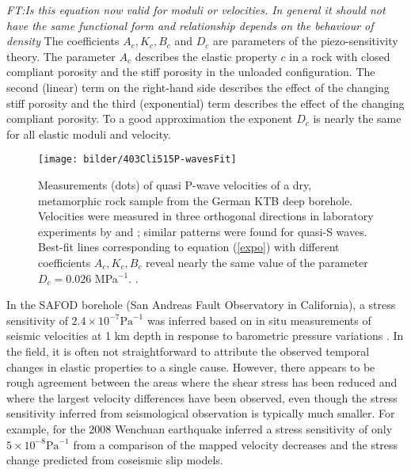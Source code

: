 \documentclass[11pt]{article}
\newcommand{\noteft}[1]{{\it \color{magenta} FT:#1}}
\newcommand{\noteft}[1]{}
\begin{document}
\begin{description}
\begin{equation}
\label{expo}
\end{equation}
\noteft{Is this equation now valid for moduli or velocities. In general it should not have the same functional form and relationship depends on the behaviour of density}
The  coefficients $A_c, K_c, B_c$ and
$D_c$ %
are parameters of the piezo-sensitivity
theory. The parameter $A_c$ describes the elastic property $c$ in a rock 
with closed compliant porosity and the stiff porosity in the unloaded 
configuration. The second (linear) term on the right-hand side describes 
the effect of the changing stiff porosity and the third (exponential) 
term describes the effect of the changing compliant porosity. To a good 
approximation the exponent $D_c$ is nearly the same for all elastic 
moduli and velocity.

\begin{SCfigure}%
         \centering
 \texttt{[image: bilder/403Cli515P-wavesFit]}
            \caption{\footnotesize Measurements (dots) of quasi P-wave velocities %
    of a dry, metamorphic rock sample from the German KTB deep borehole.
    Velocities were measured in three
    orthogonal directions 
    in laboratory experiments by \citet{Kern90} and \citet{Kern91}; similar patterns were found for quasi-S waves.
    Best-fit lines corresponding to equation (\ref{expo})
    with different coefficients $A_c, K_c, B_c$
    reveal nearly the same
      value of the parameter $D_c = 0.026$ MPa$^{-1}$. \citep[After][]{shapiroKaselow2005}.}
                   \label{fig_ktb_velocities}
	        \end{SCfigure}
	        
In the SAFOD borehole (San Andreas Fault Observatory in California), a stress sensitivity of $2.4\!\times\!10^{-7} \mbox{Pa}^{-1}$ was inferred based on in situ measurements of seismic velocities at 1 km depth in response to barometric pressure variations \citep{niu08}. In the field, it is often not straightforward to attribute the observed temporal changes in elastic properties to a single cause. However, there appears to be rough agreement between the areas where the shear stress has been reduced and where the largest velocity differences have been observed, even though the stress sensitivity inferred from seismological observation is typically much smaller. For example, for the 2008 Wenchuan earthquake \citet{chen10_grl} inferred a stress sensitivity of only $5\!\times\!10^{-8}\mbox{Pa}^{-1}$ from a comparison of the mapped velocity decreases and the stress change predicted from coseismic slip models.


\end{description}
\end{document}
